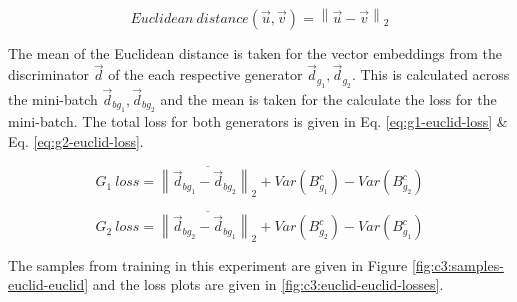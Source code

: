 \begin{equation} 
    Euclidean\ distance(\vec u, \vec v) = \left \lVert \vec u - \vec v \right \rVert_2
    \label{eq:euclid-dist}
\end{equation}

The mean of the Euclidean distance is taken for the vector embeddings from the discriminator $\vec d$ of the each respective generator $\vec d_{g_{1}}, \vec d_{g_{2}}$. 
This is calculated across the mini-batch $\vec d_{bg_{1}}, \vec d_{bg_{2}}$ and the mean is taken for the calculate the loss for the mini-batch. 
The total loss for both generators is given in Eq. \ref{eq:g1-euclid-loss} \& Eq. \ref{eq:g2-euclid-loss}.

\begin{equation} 
    G_{1}\ loss = \overline{\left \lVert \vec d_{bg_{1}} - \vec d_{bg_{2}} \right \rVert_2} + Var(B_{g_{1}}^{c}) - Var(B_{g_{2}}^{c})
    \label{eq:g1-euclid-loss}
\end{equation}

\begin{equation} 
    G_{2}\ loss = \overline{\left \lVert \vec d_{bg_{2}} - \vec d_{bg_{1}} \right \rVert_2} + Var(B_{g_{2}}^{c}) - Var(B_{g_{1}}^{c})
    \label{eq:g2-euclid-loss}
\end{equation}

The samples from training in this experiment are given in Figure \ref{fig:c3:samples-euclid-euclid} and the loss plots are given in \ref{fig:c3:euclid-euclid-losses}.

